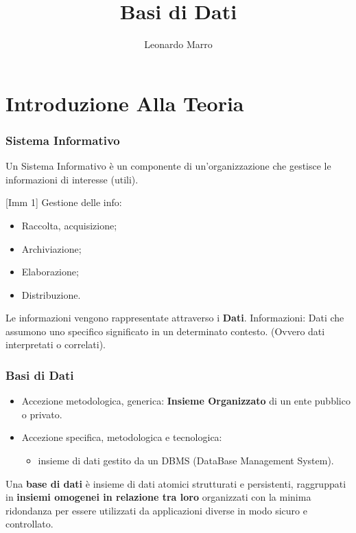 \documentclass[10pt,twocolumn]{article}
\title{Basi di Dati}
\author{Leonardo Marro}
\begin{document}
 
 \hypertarget{home}{ }
 \tableofcontents
 \clearpage
\part{Introduzione Alla Teoria}

\section{Sistema Informativo}

Un Sistema Informativo è un componente di un'organizzazione che gestisce le informazioni di interesse (utili).

[Imm 1]
Gestione delle info:
\begin{itemize}
    \item Raccolta, acquisizione;
    \item Archiviazione;
    \item Elaborazione;
    \item Distribuzione.
\end{itemize}
Le informazioni vengono rappresentate attraverso i \textbf{Dati}.
\newline
Informazioni: Dati che assumono uno specifico significato in un determinato contesto. (Ovvero dati interpretati o correlati).


\section{Basi di Dati}
\begin{itemize}
    \item Accezione metodologica, generica: \textbf{Insieme Organizzato} di un ente pubblico o privato. 
    \item Accezione specifica, metodologica e tecnologica:
    \begin{itemize}
        \item insieme di dati gestito da un DBMS (DataBase Management System).
    \end{itemize}
\end{itemize}
Una \textbf{base di dati} è insieme di dati atomici strutturati e persistenti, raggruppati in \textbf{insiemi omogenei in relazione tra loro} organizzati con la minima ridondanza per essere utilizzati da applicazioni diverse in modo sicuro e controllato.
\end{document}
